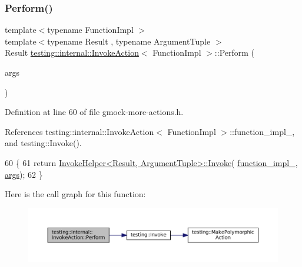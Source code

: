 \mbox{\label{classtesting_1_1internal_1_1InvokeAction_af357ce691795b3520de1fda4ab8af8b2}} 
\subsubsection{\texorpdfstring{Perform()}{Perform()}}
{\footnotesize\ttfamily template$<$typename Function\+Impl $>$ \\
template$<$typename Result , typename Argument\+Tuple $>$ \\
Result \hyperlink{classtesting_1_1internal_1_1InvokeAction}{testing\+::internal\+::\+Invoke\+Action}$<$ Function\+Impl $>$\+::Perform (\begin{DoxyParamCaption}\item[{const Argument\+Tuple \&}]{args }\end{DoxyParamCaption})\hspace{0.3cm}{\ttfamily [inline]}}



Definition at line 60 of file gmock-\/more-\/actions.\+h.



References testing\+::internal\+::\+Invoke\+Action$<$ Function\+Impl $>$\+::function\+\_\+impl\+\_\+, and testing\+::\+Invoke().


\begin{DoxyCode}
60                                             \{
61     \textcolor{keywordflow}{return} \hyperlink{namespacetesting_a80b82dc382445d240ff011f9c34aefc4}{InvokeHelper<Result, ArgumentTuple>::Invoke}(
      \hyperlink{classtesting_1_1internal_1_1InvokeAction_afe2a9f6157cfd9c8b369987411f53337}{function\_impl\_}, \hyperlink{namespacegenerate__debs_a75f9143e38df82d83b2e8a6f99cae02c}{args});
62   \}
\end{DoxyCode}
Here is the call graph for this function\+:
\nopagebreak
\begin{figure}[H]
\begin{center}
\leavevmode
\includegraphics[width=350pt]{classtesting_1_1internal_1_1InvokeAction_af357ce691795b3520de1fda4ab8af8b2_cgraph}
\end{center}
\end{figure}



